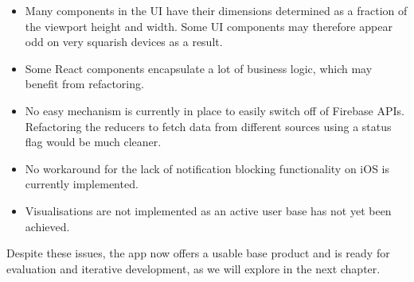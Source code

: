 \begin{itemize}
    \item Many components in the UI have their dimensions determined as a fraction of the viewport height and width. Some UI components may therefore appear odd on very squarish devices as a result.
    \item Some React components encapsulate a lot of business logic, which may benefit from refactoring.
    \item No easy mechanism is currently in place to easily switch off of Firebase APIs. Refactoring the reducers to fetch data from different sources using a status flag would be much cleaner.
    \item No workaround for the lack of notification blocking functionality on iOS is currently implemented.
    \item Visualisations are not implemented as an active user base has not yet been achieved.
\end{itemize}

Despite these issues, the app now offers a usable base product and is ready for evaluation and iterative development, as we will explore in the next chapter.